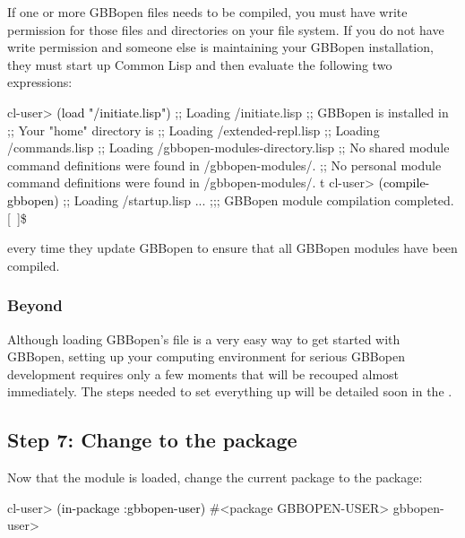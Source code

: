 \documentclass[10pt,twoside,english,pdftex]{article}
\begin{document}
%
%
%
%
If one or more GBBopen files needs to be compiled, you must have write
permission for those files and directories on your file system.  If you do not
have write permission and someone else is maintaining your GBBopen
installation, they must start up Common Lisp and then evaluate the following
two expressions:
%
\W\supp
\begin{example}
\textcolor{darkergray}{%
  cl-user> \textcolor{black}{(load "/initiate.lisp")}
  ;; Loading /initiate.lisp
  ;; GBBopen is installed in 
  ;; Your "home" directory is 
  ;;     Loading /extended-repl.lisp
  ;;     Loading /commands.lisp
  ;;     Loading /gbbopen-modules-directory.lisp
  ;; No shared module command definitions were found in /gbbopen-modules/.
  ;; No personal module command definitions were found in /gbbopen-modules/.
  t
  cl-user> \textcolor{black}{(compile-gbbopen)}
  ;; Loading /startup.lisp
     ...
  ;;; GBBopen module compilation completed.
  [~]\$}
\end{example}
%
every time they update GBBopen to ensure that all GBBopen modules have
been compiled.

\subsubsection*{Beyond }

Although loading GBBopen's 
file is a very easy way to get started with GBBopen, setting up your computing
environment for serious GBBopen development requires only a few moments that
will be recouped almost immediately.  The steps needed to set everything up
will be detailed soon in the .

\subsection*{Step 7: Change to the  package}

%
%
%
Now that the  module is loaded, change the current package
to the  package:
%
\W\supp
\begin{example}
\textcolor{darkergray}{%
  cl-user> \textcolor{black}{(in-package :gbbopen-user)}
  #<package GBBOPEN-USER>
  gbbopen-user>}
\end{example}
\end{document}
